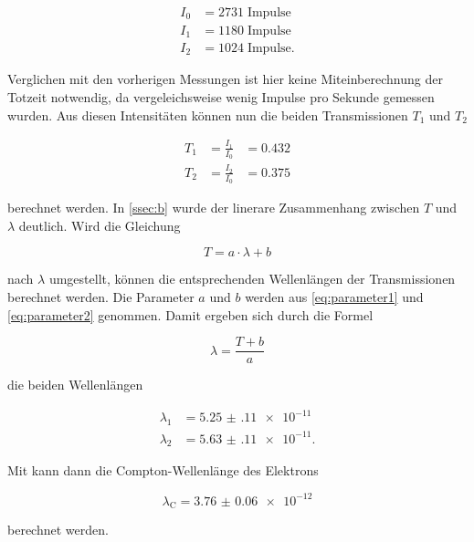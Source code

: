\begin{align*}
    I_0 &= 2731 \; \text{Impulse}\\
    I_1 &= 1180 \; \text{Impulse}\\
    I_2 &= 1024 \; \text{Impulse}.
\end{align*}

Verglichen mit den vorherigen Messungen ist hier keine Miteinberechnung der Totzeit notwendig, da vergeleichsweise wenig Impulse pro Sekunde gemessen wurden.
Aus diesen Intensitäten können nun die beiden Transmissionen $T_1$ und $T_2$

\begin{align*}
    T_1 &= \frac{I_1}{I_0} &= 0.432\\
    T_2 &= \frac{I_2}{I_0} &= 0.375
\end{align*}

berechnet werden.
In \autoref{ssec:b} wurde der linerare Zusammenhang zwischen $T$ und $\lambda$ deutlich.
Wird die Gleichung 

\begin{equation}
    T = a \cdot \lambda + b
\end{equation}

nach $\lambda$ umgestellt, können die entsprechenden Wellenlängen der Transmissionen berechnet werden.
Die Parameter $a$ und $b$ werden aus \autoref{eq:parameter1} und \autoref{eq:parameter2} genommen.
Damit ergeben sich durch die Formel 

\begin{equation}
    \lambda = \frac{T + b}{a}
\end{equation}

die beiden Wellenlängen

\begin{align*}
    \lambda _1 &= \num{5.25(11)e-11}\\
    \lambda _2 &= \num{5.63(11)e-11}.
\end{align*}

Mit \label{eq:deltalambda} kann dann die Compton-Wellenlänge des Elektrons

\begin{equation}
    \lambda _\text{C} = \num{3.76(6)e-12}
\end{equation}

berechnet werden.